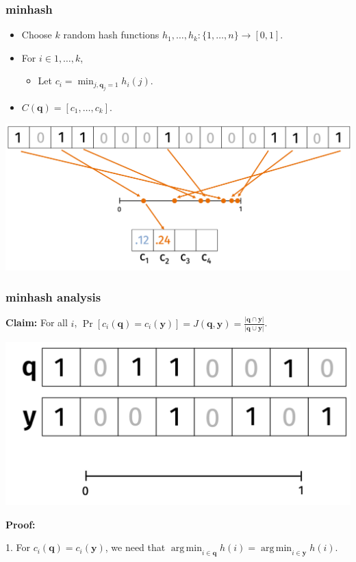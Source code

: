 \documentclass[compress]{beamer}
\newcommand{\bv}[1]{\mathbf{#1}}
\DeclareMathOperator*{\argmin}{arg\,min}
\begin{document}
\begin{frame}
	\frametitle{minhash}
	\begin{itemize}
		\item Choose $k$ random hash functions $h_1, \ldots, h_k: \{1,\ldots, n\} \rightarrow [0,1]$. 
		\item For $i\in 1, \ldots,k$, 
		\begin{itemize}
			\item Let $c_i = \min_{j, \bv{q}_j = 1} h_i(j)$.
		\end{itemize}
		\item $C(\bv{q}) = [c_1, \ldots, c_k]$.
	\end{itemize}
	\begin{center}
		\includegraphics[width=\textwidth]{minHash2.png}	
	\end{center}
\end{frame}

\begin{frame}[t]
	\frametitle{minhash analysis}
	\textbf{Claim:} For all $i$, $\Pr[c_i(\bv{q}) = c_i(\bv{y})] = J(\bv{q},\bv{y}) = \frac{|\bv{q} \cap \bv{y}|}{|\bv{q} \cup \bv{y}|}$.
	\begin{center}
		\includegraphics[width=.8\textwidth]{minHashSimple.png}
	\end{center}
	\textbf{Proof:} 
	
	1. For $c_i(\bv{q}) = c_i(\bv{y})$, we need that $\argmin_{i\in \bv{q}} h(i) = \argmin_{i\in \bv{y}} h(i)$.
\end{frame}
\end{document}
